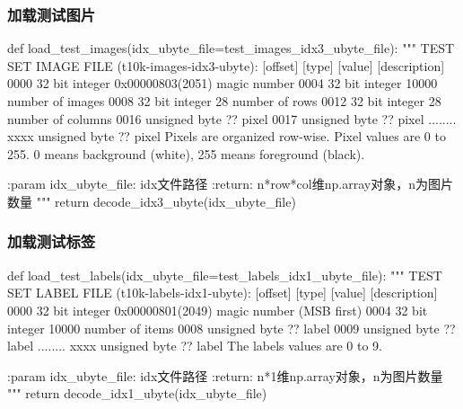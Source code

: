 \subsubsection{加载测试图片}
\begin{python}
  def load_test_images(idx_ubyte_file=test_images_idx3_ubyte_file):
    """
    TEST SET IMAGE FILE (t10k-images-idx3-ubyte):
    [offset] [type]          [value]          [description]
    0000     32 bit integer  0x00000803(2051) magic number
    0004     32 bit integer  10000            number of images
    0008     32 bit integer  28               number of rows
    0012     32 bit integer  28               number of columns
    0016     unsigned byte   ??               pixel
    0017     unsigned byte   ??               pixel
    ........
    xxxx     unsigned byte   ??               pixel
    Pixels are organized row-wise. Pixel values are 0 to 255. 0 means background (white), 255 means foreground (black).

    :param idx_ubyte_file: idx文件路径
    :return: n*row*col维np.array对象，n为图片数量
    """
    return decode_idx3_ubyte(idx_ubyte_file)
\end{python}

\subsubsection{加载测试标签}
\begin{python}
  def load_test_labels(idx_ubyte_file=test_labels_idx1_ubyte_file):
    """
    TEST SET LABEL FILE (t10k-labels-idx1-ubyte):
    [offset] [type]          [value]          [description]
    0000     32 bit integer  0x00000801(2049) magic number (MSB first)
    0004     32 bit integer  10000            number of items
    0008     unsigned byte   ??               label
    0009     unsigned byte   ??               label
    ........
    xxxx     unsigned byte   ??               label
    The labels values are 0 to 9.

    :param idx_ubyte_file: idx文件路径
    :return: n*1维np.array对象，n为图片数量
    """
    return decode_idx1_ubyte(idx_ubyte_file)
\end{python}

